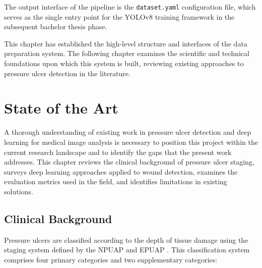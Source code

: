 \documentclass[a4paper,12pt,twoside]{report}
\begin{document}
The output interface of the pipeline is the \texttt{dataset.yaml} configuration
file, which serves as the single entry point for the YOLOv8 training framework
in the subsequent bachelor thesis phase.

This chapter has established the high-level structure and interfaces of the data
preparation system. The following chapter examines the scientific and technical
foundations upon which this system is built, reviewing existing approaches to
pressure ulcer detection in the literature.

\chapter{State of the Art}
\label{ch:state-of-art}

A thorough understanding of existing work in pressure ulcer detection and deep
learning for medical image analysis is necessary to position this project within
the current research landscape and to identify the gaps that the present work
addresses. This chapter reviews the clinical background of pressure ulcer
staging, surveys deep learning approaches applied to wound detection, examines
the evaluation metrics used in the field, and identifies limitations in existing
solutions.

\section{Clinical Background}
\label{sec:clinical-background}

Pressure ulcers are classified according to the depth of tissue damage using the
staging system defined by the NPUAP and EPUAP \citep{npuap2019staging}. This
classification system comprises four primary categories and two supplementary
categories:
\end{document}
